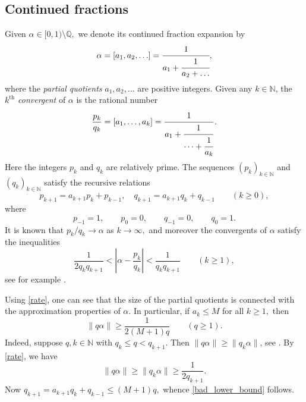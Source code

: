 \documentclass[12pt, reqno]{amsart}
\theoremstyle{definition}
\theoremstyle{remark}
\numberwithin{equation}{section}
\def\alp{{\alpha}} \def\bfalp{{\boldsymbol \alpha}}
\def\ls{\leqslant} \def\gs{\geqslant}
\def \bN {\mathbb N}
\def \bQ {\mathbb Q}
\begin{document}
	\subsection{Continued fractions} 
	Given $\alpha\in [0,1) \setminus \bQ,$ we denote its continued fraction expansion by 
	\[
	\alpha = [a_1, a_2, \ldots] = \cfrac{1}{a_1 + \cfrac{1}{a_2 + \dots }}, 
	\]
	where the {\it partial quotients} $a_1, a_2, \ldots$ are positive integers. Given any $k \in \bN$, the $k^{\mathrm{th}}$ \emph{convergent} of $\alpha$ is the rational number
	\[ 
	\frac{p_k}{q_k} = [a_1,\ldots, a_k] = \cfrac{1}{a_1 + \cfrac{1}{ \dots + \cfrac{1}{a_k}}} \, .
	\]
	Here the integers $p_k$ and $q_k$ are relatively prime. The sequences $(p_k)_{k\in\bN}$ and $(q_k)_{k\in\bN}$ satisfy the recursive relations \begin{equation} \label{recursive} 
		p_{k+1} =
		a_{k+1}p_k + p_{k-1},
		\quad
		q_{k+1} =
		a_{k+1}q_k + q_{k-1}
		\qquad (k \ge 0),
	\end{equation}
	where 
	\[
	p_{-1}=1, 
	\qquad
	p_0 = 0, 
	\qquad
	q_{-1}=0,
	\qquad
	q_0=1.
	\]
	It is known that   $p_k/q_k \to \alp$ as $k\to \infty,$ and moreover the convergents of $\alp$ satisfy the inequalities 
	\begin{equation} \label{rate}
		\frac{1}{2q_k q_{k+1}} < \left| \alp - \frac{p_k}{q_k}\right| < \frac{1}{q_k q_{k+1}} \qquad (k\gs 1), 
	\end{equation}
	see  for example  \cite[Chapter 7.5]{NZM1991}. 
	
	Using \eqref{rate}, one can see that the size of the partial quotients is connected with the approximation properties of $\alp.$ In particular, if $a_k \ls M$ for all $k\gs 1,$ then 
	\begin{equation} \label{bad_lower_bound}
		\| q\alp\| \gs \frac{1}{2(M+1)q} \qquad (q\gs 1). 
	\end{equation}
	Indeed, suppose $q, k \in \bN$ with $q_k \ls q < q_{k+1}.$ Then $\|q\alp\| \gs \|q_k\alp\|$, see \cite[Chapter II.2]{RS1992}. By \eqref{rate}, we have
	\[ 
	\|q\alp\| \gs \|q_k \alp\| \gs \frac{1}{2q_{k+1}}.
	\]
	Now $q_{k+1} = a_{k+1}q_{k}+q_{k-1} \ls (M+1)q,$ whence \eqref{bad_lower_bound} follows. 
	
\end{document}
